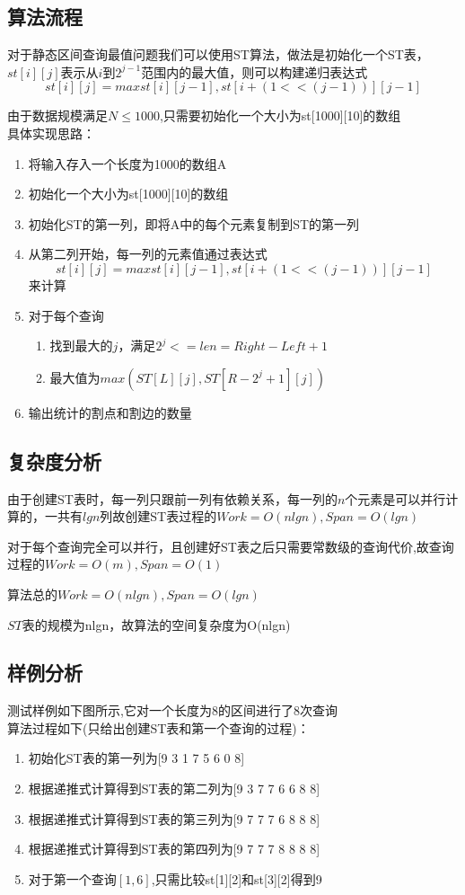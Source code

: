 \documentclass[UTF8,a4paperdui, %
]{ctexart}
\begin{document}
\subsection{算法流程}
对于静态区间查询最值问题我们可以使用ST算法，做法是初始化一个ST表，$st[i][j]$表示从$i$到$2^{j-1}$范围内的最大值，则可以构建递归表达式$$st[ i ][ j ] =max{ st[ i ][ j-1 ] , st[ i+(1<<(j-1)) ][ j-1 ] }$$
\par 由于数据规模满足$N \leq 1000$,只需要初始化一个大小为st[1000][10]的数组\\
具体实现思路：
\begin{enumerate}
    \item 将输入存入一个长度为1000的数组A
    \item 初始化一个大小为st[1000][10]的数组
    \item 初始化ST的第一列，即将A中的每个元素复制到ST的第一列
    \item 从第二列开始，每一列的元素值通过表达式$$st[ i ][ j ] =max{ st[ i ][ j-1 ] , st[ i+(1<<(j-1)) ][ j-1 ] }$$来计算
    \item 对于每个查询\begin{enumerate}
        \item 找到最大的$j$，满足$2^j <= len  = Right - Left + 1$
        \item 最大值为$max(ST[L][j], ST[R-2^j+1][j])$
    \end{enumerate}
    \item 输出统计的割点和割边的数量
\end{enumerate}
\subsection{复杂度分析}
由于创建ST表时，每一列只跟前一列有依赖关系，每一列的$n$个元素是可以并行计算的，一共有$lgn$列故创建ST表过程的$Work=O(nlgn),Span=O(lgn)$\par
对于每个查询完全可以并行，且创建好ST表之后只需要常数级的查询代价,故查询过程的$Work=O(m),Span=O(1)$\par
算法总的$Work=O(nlgn),Span=O(lgn)$\par
$ST$表的规模为nlgn，故算法的空间复杂度为O(nlgn)

\subsection{样例分析}
测试样例如下图所示,它对一个长度为8的区间进行了8次查询
\\
算法过程如下(只给出创建ST表和第一个查询的过程)：
\begin{enumerate}
    \item 初始化ST表的第一列为[9 3 1 7 5 6 0 8]
    \item 根据递推式计算得到ST表的第二列为[9 3 7 7 6 6 8 8]
    \item 根据递推式计算得到ST表的第三列为[9 7 7 7 6 8 8 8]
    \item 根据递推式计算得到ST表的第四列为[9 7 7 7 8 8 8 8]
    \item 对于第一个查询$[1,6]$,只需比较st[1][2]和st[3][2]得到9
\end{enumerate}
\newpage
\end{document}

